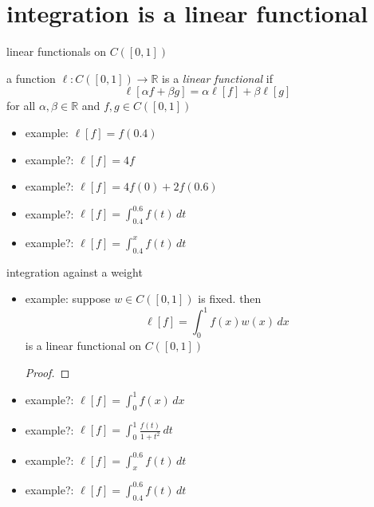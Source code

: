 \documentclass[10pt,
               svgnames,
               hyperref={colorlinks,citecolor=DeepPink4,linkcolor=FireBrick,urlcolor=Maroon},
               usepdftitle=false]{beamer}
\newcommand{\RR}{\mathbb{R}}
\begin{document}
\AtBeginSection[] {
    \begin{frame}{Outline}
    \setbeamertemplate{section in toc}[sections numbered]
    \tableofcontents[currentsection]%
    \end{frame}
}


\section{integration is a linear functional}


\begin{frame}{linear functionals on $C([0,1])$}

\begin{definition}
a function $\ell:C([0,1]) \to \RR$ is a \emph{linear functional} if
	$$\ell[\alpha f + \beta g] = \alpha \ell[f] + \beta \ell[g]$$
for all $\alpha,\beta \in\RR$ and $f,g\in C([0,1])$
\end{definition}

\bigskip

\begin{itemize}
\item example: $\ell[f] = f(0.4)$

\bigskip
\item example?: $\ell[f] = 4 f$

\bigskip
\item example?: $\ell[f] = 4 f(0) + 2 f(0.6)$

\bigskip
\item example?: $\ell[f] = \int_{0.4}^{0.6} f(t)\,dt$

\bigskip
\item example?: $\ell[f] = \int_{0.4}^{x} f(t)\,dt$
\end{itemize}

\vspace{20mm}
\end{frame}


\begin{frame}{integration against a weight}

\begin{itemize}
\item example: suppose $w\in C([0,1])$ is fixed.  then
	$$\ell[f] = \int_0^1 f(x) w(x)\,dx$$
is a linear functional on $C([0,1])$

\begin{proof}
\vspace{10mm}
\end{proof}

\item example?: $\ell[f] = \int_0^1 f(x) \,dx$

\medskip
\item example?: $\ell[f] = \int_0^1 \frac{f(t)}{1+t^2} \,dt$

\medskip
\item example?: $\ell[f] = \int_{x}^{0.6} f(t) \,dt$

\medskip
\item example?: $\ell[f] = \int_{0.4}^{0.6} f(t) \,dt$

\medskip
\end{itemize}
\end{frame}
\end{document}
